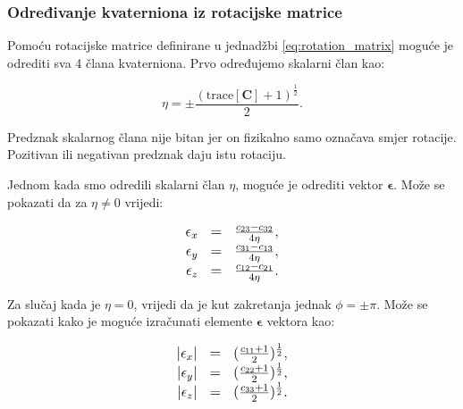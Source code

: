 \documentclass[times, utf8, diplomski, numeric]{templates/template}
\begin{document}
{{{            \subsubsection{Određivanje kvaterniona iz rotacijske matrice}{
                Pomoću rotacijske matrice definirane u jednadžbi \ref{eq:rotation_matrix} moguće je odrediti sva 4 člana kvaterniona. Prvo određujemo skalarni član kao:

                \begin{equation}
                    \eta = \pm\frac{(\text{trace}[\boldsymbol{C}] + 1)^{\frac{1}{2}}}{2}.
                \end{equation}

                Predznak skalarnog člana nije bitan jer on fizikalno samo označava smjer rotacije. Pozitivan ili negativan predznak daju istu rotaciju.

                Jednom kada smo odredili skalarni član $\eta$, moguće je odrediti vektor $\boldsymbol\epsilon$. Može se pokazati da za $\eta \neq 0$ vrijedi:

                \begin{equation}
                \large
                \begin{array}{rcl}
                    \epsilon_{x} & = & \frac{c_{23} - c_{32}}{4\eta}, \\
                    \epsilon_{y} & = & \frac{c_{31} - c_{13}}{4\eta}, \\
                    \epsilon_{z} & = & \frac{c_{12} - c_{21}}{4\eta}.
                \end{array}
                \end{equation}

                Za slučaj kada je $\eta=0$, vrijedi da je kut zakretanja jednak $\phi=\pm\pi$. Može se pokazati kako je moguće izračunati elemente $\boldsymbol\epsilon$ vektora kao:

                \begin{equation}
                \large
                \begin{array}{rcl}
                    |\epsilon_{x}| & = & (\frac{c_{11} + 1}{2})^{\frac{1}{2}}, \\
                    |\epsilon_{y}| & = & (\frac{c_{22} + 1}{2})^{\frac{1}{2}}, \\
                    |\epsilon_{z}| & = & (\frac{c_{33} + 1}{2})^{\frac{1}{2}}.
                \end{array}
                \end{equation}

}}}}
\end{document}
